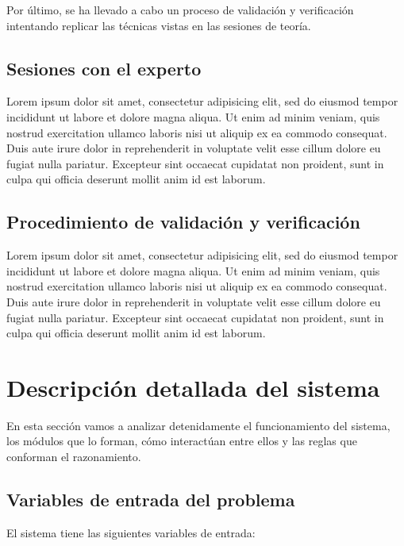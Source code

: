 \documentclass[a4paper, 11pt, titlepage]{article}
\begin{document}
    Por último, se ha llevado a cabo un proceso de validación y verificación intentando replicar las técnicas vistas en las sesiones de teoría.

    \subsection{Sesiones con el experto}
    Lorem ipsum dolor sit amet, consectetur adipisicing elit, sed do eiusmod tempor incididunt ut labore et dolore magna aliqua. Ut enim ad minim veniam, quis nostrud exercitation ullamco laboris nisi ut aliquip ex ea commodo consequat. Duis aute irure dolor in reprehenderit in voluptate velit esse cillum dolore eu fugiat nulla pariatur. Excepteur sint occaecat cupidatat non proident, sunt in culpa qui officia deserunt mollit anim id est laborum.

    \subsection{Procedimiento de validación y verificación}
    Lorem ipsum dolor sit amet, consectetur adipisicing elit, sed do eiusmod tempor incididunt ut labore et dolore magna aliqua. Ut enim ad minim veniam, quis nostrud exercitation ullamco laboris nisi ut aliquip ex ea commodo consequat. Duis aute irure dolor in reprehenderit in voluptate velit esse cillum dolore eu fugiat nulla pariatur. Excepteur sint occaecat cupidatat non proident, sunt in culpa qui officia deserunt mollit anim id est laborum.

    \section{Descripción detallada del sistema}

    En esta sección vamos a analizar detenidamente el funcionamiento del sistema, los módulos que lo forman, cómo interactúan entre ellos y las reglas que conforman el razonamiento.

    \subsection{Variables de entrada del problema}
    \label{ch:varEntrada}

    El sistema tiene las siguientes variables de entrada:
\end{document}
